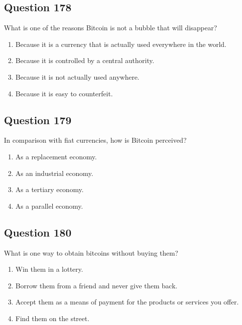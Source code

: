 \documentclass[12pt,a4paper]{article}
\begin{document}
\bigskip


\subsection*{Question 178}
What is one of the reasons Bitcoin is not a bubble that will disappear?

\begin{enumerate}[label=\Alph*., leftmargin=*]
\item Because it is a currency that is actually used everywhere in the world.
\item Because it is controlled by a central authority.
\item Because it is not actually used anywhere.
\item Because it is easy to counterfeit.
\end{enumerate}

\bigskip


\subsection*{Question 179}
In comparison with fiat currencies, how is Bitcoin perceived?

\begin{enumerate}[label=\Alph*., leftmargin=*]
\item As a replacement economy.
\item As an industrial economy.
\item As a tertiary economy.
\item As a parallel economy.
\end{enumerate}

\bigskip


\subsection*{Question 180}
What is one way to obtain bitcoins without buying them?

\begin{enumerate}[label=\Alph*., leftmargin=*]
\item Win them in a lottery.
\item Borrow them from a friend and never give them back.
\item Accept them as a means of payment for the products or services you offer.
\item Find them on the street.
\end{enumerate}
\end{document}
